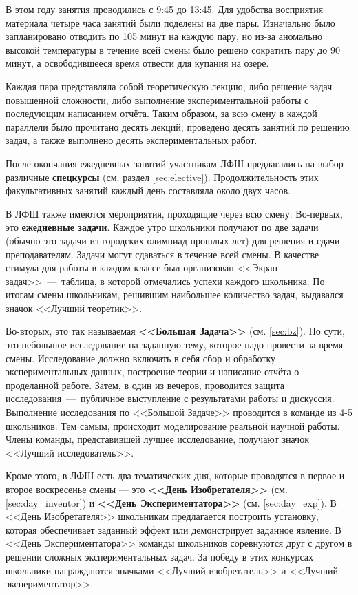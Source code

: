 \documentclass[12pt,a4paper,oneside,draft]{scrartcl}
\begin{document}
В этом году занятия проводились с 9:45 до 13:45. Для удобства
восприятия материала четыре часа занятий были поделены на две
пары. Изначально было запланировано отводить по 105 минут на каждую
пару, но из-за аномально высокой температуры в течение всей смены было
решено сократить пару до 90 минут, а освободившееся время отвести для
купания на озере.

Каждая пара представляла собой теоретическую лекцию, либо решение
задач повышенной сложности, либо выполнение экспериментальной работы с
последующим написанием отчёта. Таким образом, за всю смену в каждой
параллели было прочитано десять лекций, проведено десять занятий по
решению задач, а также выполнено десять экспериментальных работ.

После окончания ежедневных занятий участникам ЛФШ предлагались на
выбор различные \textbf{спецкурсы} (см. раздел
\ref{sec:elective}). Продолжительность этих факультативных занятий
каждый день составляла около двух часов. 

В ЛФШ также имеются мероприятия, проходящие через всю
смену. Во-первых, это \textbf{ежедневные задачи}. Каждое утро школьники
получают по две задачи (обычно это задачи из городских олимпиад
прошлых лет) для решения и сдачи преподавателям. Задачи могут
сдаваться в течение всей смены. В качестве стимула для работы в каждом
классе был организован <<Экран задач>>~---~таблица, в которой
отмечались успехи каждого школьника. По итогам смены школьникам,
решившим наибольшее количество задач, выдавался значок <<Лучший
теоретик>>. 

Во-вторых, это так называемая \textbf{<<Большая Задача>>}
(см. \ref{sec:bz}). По сути, это небольшое исследование на заданную
тему, которое надо провести за время смены. Исследование должно
включать в себя сбор и обработку экспериментальных данных, построение
теории и написание отчёта о проделанной работе. Затем, в один из
вечеров, проводится защита исследования~---~публичное выступление с
результатами работы и дискуссия. Выполнение исследования по <<Большой
Задаче>> проводится в команде из 4-5 школьников. Тем самым, происходит
моделирование реальной научной работы. Члены команды, представившей
лучшее исследование, получают значок <<Лучший исследователь>>.

Кроме этого, в ЛФШ есть два тематических дня, которые проводятся в
первое и второе воскресенье смены --- это \textbf{<<День Изобретателя>>}
(см. \ref{sec:day_inventor}) и \textbf{<<День Экспериментатора>>}
(см. \ref{sec:day_exp}). В <<День Изобретателя>> школьникам
предлагается построить установку, которая обеспечивает заданный эффект
или демонстрирует заданное явление. В <<День Экспериментатора>>
команды школьников соревнуются друг с другом в решении сложных
экспериментальных задач. За победу в этих конкурсах школьники
награждаются значками <<Лучший изобретатель>> и <<Лучший
экспериментатор>>.
\end{document}
